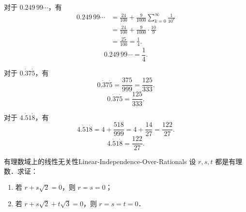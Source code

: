 \begin{solution}
    对于 $0.249\,99\cdots$，有
    \begin{equation}
        \begin{aligned}
            0.249\,99\cdots & = \frac{24}{100} + \frac{9}{1000} \sum_{k=0}^{\infty} \frac{1}{10^k} \\
                            & = \frac{24}{100} + \frac{9}{1000} \cdot \frac{10}{9}                 \\
                            & = \frac{25}{100} = \frac{1}{4}.
        \end{aligned}
    \end{equation}
    \begin{equation}
        \boxed{0.249\,99\cdots = \frac{1}{4}.}
    \end{equation}

    对于 $0.\dot{3}7\dot{5}$，有
    \begin{equation}
        0.\dot{3}7\dot{5} = \frac{375}{999} = \frac{125}{333}.
    \end{equation}
    \begin{equation}
        \boxed{0.\dot{3}7\dot{5} = \frac{125}{333}.}
    \end{equation}

    对于 $4.\dot{5}1\dot{8}$，有
    \begin{equation}
        4.\dot{5}1\dot{8} = 4 + \frac{518}{999} = 4 + \frac{14}{27} = \frac{122}{27}.
    \end{equation}
    \begin{equation}
        \boxed{4.\dot{5}1\dot{8} = \frac{122}{27}.}
    \end{equation}
\end{solution}

\begin{problem}{有理数域上的线性无关性}{Linear-Independence-Over-Rationals}
    设 $r, s, t$ 都是有理数．求证：
    \begin{enumerate}
        \item 若 $r + s\sqrt{2} = 0$，则 $r = s = 0$；
        \item 若 $r + s\sqrt{2} + t\sqrt{3} = 0$，则 $r = s = t = 0$．
    \end{enumerate}
\end{problem}

